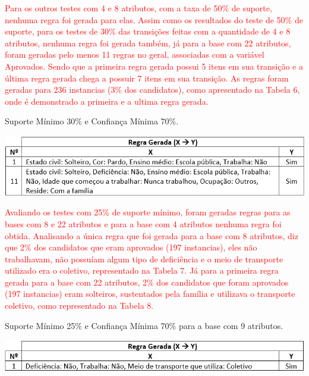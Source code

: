 \par
\textcolor{red}{Para os outros testes com 4 e 8 atributos, com a taxa de 50\% de suporte, nenhuma regra foi gerada para elas. Assim como os resultados do teste de 50\% de suporte, para os testes de 30\% das transições feitas com a quantidade de 4 e 8 atributos, nenhuma regra foi gerada também, já para a base com 22 atributos, foram geradas pelo menos 11 regras no geral, associadas com a variável Aprovados. Sendo que a primeira regra gerada possui 5 itens em sua transição e a última regra gerada chega a possuir 7 itens em sua transição. As regras foram geradas para 236 instancias (3\% dos candidatos), como apresentado na Tabela 6, onde é demonstrado a primeira e a ultima regra gerada.}

\par
\begin{table}[!htp]
	\begin{center}
    \caption{\label{fig:waveform_fig} Suporte Mínimo 30\% e Confiança Mínima 70\%.}
	\includegraphics[scale=0.75]{Figuras/Suporte_30_atributos_22.png}
	\end{center}
\end{table}


\par
\textcolor{red}{Avaliando os testes com 25\% de suporte mínimo, foram geradas regras para as bases com 8 e 22 atributos e para a base com 4 atributos nenhuma regra foi obtida. Analisando a única regra que foi gerada para a base com 8 atributos, diz que 2\% dos candidatos que eram aprovados (197 instancias), eles não trabalhavam, não possuíam algum tipo de deficiência e o meio de transporte utilizado era o coletivo, representado na Tabela 7. Já para a primeira regra gerada para a base com 22 atributos, 2\% dos candidatos que foram aprovados (197 instancias) eram solteiros, sustentados pela família e utilizava o transporte coletivo, como representado na Tabela 8.}

\par
\begin{table}[!htp]
	\begin{center}
    \caption{\label{fig:waveform_fig} Suporte Mínimo 25\% e Confiança Mínima 70\% para a base com 9 atributos.}
	\includegraphics[scale=0.75]{Figuras/Suporte_25_atributos_9.png}
	\end{center}
\end{table}


